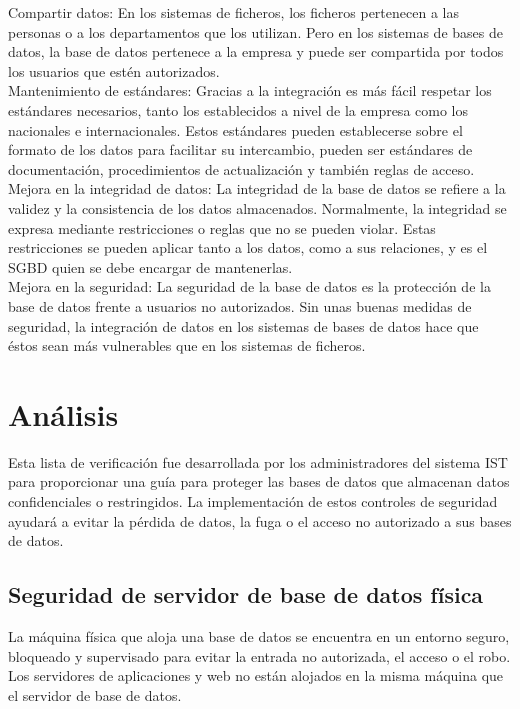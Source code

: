 Compartir datos:
En los sistemas de ficheros, los ficheros pertenecen a las personas o a los departamentos que los utilizan. Pero en los sistemas de bases de datos, la base de datos pertenece a la empresa y puede ser compartida por todos los usuarios que estén autorizados.\\

Mantenimiento de estándares:
Gracias a la integración es más fácil respetar los estándares necesarios, tanto los establecidos a nivel de la empresa como los nacionales e internacionales. Estos estándares pueden establecerse sobre el formato de los datos para facilitar su intercambio, pueden ser estándares de documentación, procedimientos de actualización y también reglas de acceso.\\

Mejora en la integridad de datos:
La integridad de la base de datos se refiere a la validez y la consistencia de los datos almacenados. Normalmente, la integridad se expresa mediante restricciones o reglas que no se pueden violar. Estas restricciones se pueden aplicar tanto a los datos, como a sus relaciones, y es el SGBD quien se debe encargar de mantenerlas.\\

Mejora en la seguridad:
La seguridad de la base de datos es la protección de la base de datos frente a usuarios no autorizados. Sin unas buenas medidas de seguridad, la integración de datos en los sistemas de bases de datos hace que éstos sean más vulnerables que en los sistemas de ficheros.

\section{Análisis}
Esta lista de verificación fue desarrollada por los administradores del sistema IST para proporcionar una guía para proteger las bases de datos que almacenan datos confidenciales o restringidos. La implementación de estos controles de seguridad ayudará a evitar la pérdida de datos, la fuga o el acceso no autorizado a sus bases de datos.

\subsection{Seguridad de servidor de base de datos física}
La máquina física que aloja una base de datos se encuentra en un entorno seguro, bloqueado y supervisado para evitar la entrada no autorizada, el acceso o el robo.\\
Los servidores de aplicaciones y web no están alojados en la misma máquina que el servidor de base de datos.

